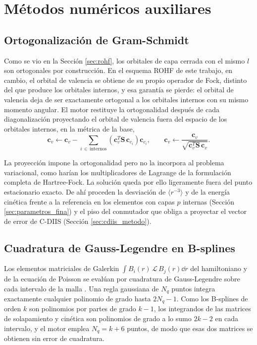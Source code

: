 \chapter{Métodos numéricos auxiliares}
\label{ap:metodos-auxiliares}

\section{Ortogonalización de Gram-Schmidt}
\label{sec:gram-schmidt}

Como se vio en la Sección \ref{sec:rohf}, los orbitales de capa cerrada con el mismo $l$ son ortogonales por construcción. En el esquema ROHF de este trabajo, en cambio, el orbital de valencia se obtiene de su propio operador de Fock, distinto del que produce los orbitales internos, y esa garantía se pierde: el orbital de valencia deja de ser exactamente ortogonal a los orbitales internos con su mismo momento angular. El motor restituye la ortogonalidad después de cada diagonalización proyectando el orbital de valencia fuera del espacio de los orbitales internos, en la métrica de la base,
\begin{equation}
    \mathbf{c}_v \leftarrow \mathbf{c}_v - \sum_{i \,\in\, \text{internos}} \left( \mathbf{c}_v^T \mathbf{S}\, \mathbf{c}_{c_i} \right) \mathbf{c}_{c_i},
    \qquad
    \mathbf{c}_v \leftarrow \frac{\mathbf{c}_v}{\sqrt{\mathbf{c}_v^T \mathbf{S}\, \mathbf{c}_v}}.
\end{equation}

La proyección impone la ortogonalidad pero no la incorpora al problema variacional, como harían los multiplicadores de Lagrange de la formulación completa de Hartree-Fock. La solución queda por ello ligeramente fuera del punto estacionario exacto. De ahí proceden la desviación de $\langle r^{-3}\rangle$ y de la energía cinética frente a la referencia en los elementos con capas $p$ internas (Sección \ref{sec:parametros_fina}) y el piso del conmutador que obliga a proyectar el vector de error de C-DIIS (Sección \ref{sec:cdiis_metodo}).

\section{Cuadratura de Gauss-Legendre en B-splines}
\label{sec:gauss-legendre}

Los elementos matriciales de Galerkin $\int B_i(r)\,\mathcal{L}\,B_j(r) \dd{r}$ del hamiltoniano y de la ecuación de Poisson se evalúan por cuadratura de Gauss-Legendre sobre cada intervalo de la malla \parencite{Bachau2001}. Una regla gaussiana de $N_q$ puntos integra exactamente cualquier polinomio de grado hasta $2N_q - 1$. Como los B-splines de orden $k$ son polinomios por partes de grado $k-1$, los integrandos de las matrices de solapamiento y cinética son polinomios de grado a lo sumo $2k-2$ en cada intervalo, y el motor emplea $N_q = k+6$ puntos, de modo que esas dos matrices se obtienen sin error de cuadratura.

